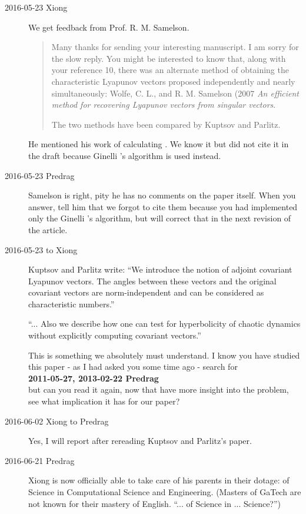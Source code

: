 \begin{description}
\item[2016-05-23 Xiong] We get feedback from Prof. R. M. Samelson.
  \begin{quotation}
    Many thanks for sending your interesting manuscript.  I am sorry for
    the slow reply.  You might be interested to know that, along with
    your reference 10, there was an alternate method of obtaining the
    characteristic Lyapunov vectors proposed independently and nearly
    simultaneously: Wolfe, C. L., and R. M. Samelson (2007
    {\em An efficient
    method for recovering Lyapunov vectors from singular vectors}.

    The two methods have been compared by Kuptsov and Parlitz.
  \end{quotation}
  He mentioned his work of calculating \cLvs. We know it but did not cite
  it in the draft because Ginelli \etal's algorithm is used instead.

\item[2016-05-23 Predrag] Samelson is right, pity he has no comments on the
paper itself. When you answer, tell him
that we forgot to cite them because you had implemented only the Ginelli
\etal's algorithm, but will correct that in the next revision of the
article.

\item[2016-05-23 to Xiong]
Kuptsov and Parlitz write: ``We introduce the notion of
adjoint covariant Lyapunov vectors. The angles between these vectors and
the original covariant vectors are norm-independent and can be considered
as characteristic numbers.''

``... Also we describe how one can test for hyperbolicity of chaotic dynamics
without explicitly computing covariant vectors.''

This is something we absolutely must understand. I know you have studied
this paper - as I had asked you some time ago  - search for
\\{\bf 2011-05-27, 2013-02-22 Predrag}\\
but can you read it again, now that have more insight into the problem,
see what implication it has for our paper?


\item[2016-06-02 Xiong to Predrag]
Yes, I will report after rereading Kuptsov and Parlitz's paper.

\item[2016-06-21 Predrag]
Xiong is now officially able to take care of his parents in their dotage:
of Science in Computational Science and Engineering.
(Masters of GaTech are not known for their mastery of English.
``... of Science in ... Science?'')


\end{description}
